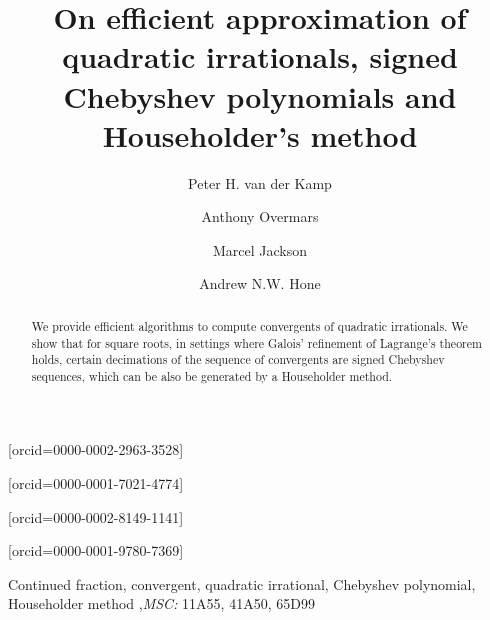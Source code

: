 \documentclass[a4paper,fleqn]{cas-sc}
\begin{document}
\let\WriteBookmarks\relax
\def\floatpagepagefraction{1}
\def\textpagefraction{.001}


\title[mode=title]{On efficient approximation of quadratic irrationals, signed Chebyshev polynomials and Householder's method}

\author[1]{Peter H. {van der Kamp}}[orcid=0000-0002-2963-3528]
\cormark[1]

\author[1]{Anthony Overmars}[orcid=0000-0001-7021-4774]

\author[1]{Marcel Jackson}[orcid=0000-0002-8149-1141]

\author[2]{Andrew N.W. Hone}[orcid=0000-0001-9780-7369]


\begin{abstract}
We provide efficient algorithms to compute convergents of quadratic irrationals. We show that for square roots, in settings where Galois' refinement of Lagrange's theorem holds, certain decimations of the sequence of convergents are signed Chebyshev
sequences, which can be also be generated by a Householder method.
\end{abstract}

\begin{keywords}
Continued fraction, convergent, quadratic irrational, Chebyshev polynomial, Householder method \sep {\em MSC:} 11A55, 41A50, 65D99
\end{keywords}

\maketitle

\end{document}
